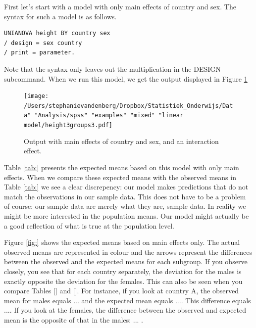 \documentclass[]{report}\usepackage[]{graphicx}\usepackage[]{color}
\begin{document}
First let's start with a model with only main effects of country and sex. The syntax for such a model is as follows.

\begin{verbatim}
UNIANOVA height BY country sex 
/ design = sex country 
/ print = parameter.
\end{verbatim}

Note that the syntax only leaves out the multiplication in the DESIGN subcommand. When we run this model, we get the output displayed in Figure \ref{fig:interactionheightcountrysexMAIN}

\begin{figure}[h]
    \begin{center}
       \texttt{[image: /Users/stephanievandenberg/Dropbox/Statistiek\_Onderwijs/Data" "Analysis/spss" "examples" "mixed" "linear model/height3groups3.pdf]}
    \end{center}
    \label{fig:interactionheightcountrysexMAIN}
    \caption{Output with main effects of country and sex, and an interaction effect.}
\end{figure}

Table \ref{tab:} presents the expected means based on this model with only main effects. When we compare these expected means with the observed means in Table \ref{tab:} we see a clear discrepency: our model makes predictions that do not match the observations in our sample data. This does not have to be a problem of course: our sample data are merely what they are, sample data. In reality we might be more interested in the population means. Our model might actually be a good reflection of what is true at the population level. 

Figure \ref{fig:} shows the expected means based on main effects only. The actual observed means are represented in colour and the arrows represent the differences between the observed and the expected means for each subgroup. If you observe closely, you see that for each country separately, the deviation for the males is exactly opposite the deviation for the females. This can also be seen when you compare Tables \ref{} and \ref{}. For instance, if you look at country A, the observed mean for males equals ... and the expected mean equals .... This difference equals .... If you look at the females, the difference between the observed and expected mean is the opposite of that in the males: ... .
\end{document}
